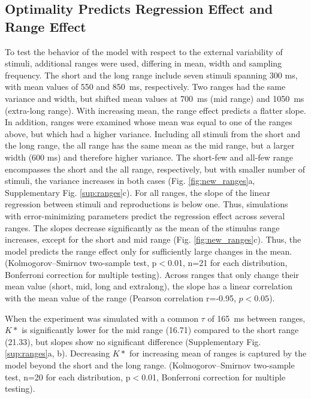 \documentclass[10pt]{article}
\begin{document}
\subsection{Optimality Predicts Regression Effect and Range Effect}
To test the behavior of the model with respect to the external variability of stimuli, additional ranges were used, differing in mean, width and sampling frequency.
The short and the long range include seven stimuli spanning 300 ms, with mean values of 550 and 850~ms, respectively. 
Two ranges had the same variance and width, but shifted mean values at 700~ms (mid range) and 1050~ms (extra-long range). With increasing mean, the range effect predicts a flatter slope. 
In addition, ranges were examined whose mean was equal to one of the ranges above, but which had a higher variance.
Including all stimuli from the short and the long range, the all range has the same mean as the mid range, but a larger width (600 ms) and therefore higher variance.
The short-few and all-few range encompasses the short and the all range, respectively, but with smaller number of stimuli, the variance increases in both cases 
(Fig. \ref{fig:new_ranges}a, Supplementary Fig. \ref{sup:ranges}c).
For all ranges, the slope of the linear regression between stimuli and reproductions is below one. Thus, simulations with error-minimizing parameters predict the regression effect across several ranges. 
The slopes decrease significantly as the mean of the stimulus range increases, except for the short and mid range (Fig. \ref{fig:new_ranges}c).
Thus, the model predicts the range effect only for sufficiently large changes in the mean. 
(Kolmogorov–Smirnov  two-sample test, p$<$0.01, n=21 for each distribution, Bonferroni correction for multiple testing).
Across ranges that only change their mean value (short, mid, long and extralong), the slope has a linear correlation with the mean value of the range (Pearson correlation r=-0.95, $p<0.05$).

When the experiment was simulated with a common $\tau$ of 165~ms between ranges, $K*$ is significantly lower for the mid range (16.71) compared to the short range (21.33), but slopes show no significant difference (Supplementary Fig. \ref{sup:ranges}a, b).
Decreasing $K*$ for increasing mean of ranges is captured by the model beyond the short and the long range.
(Kolmogorov–Smirnov two-sample test, n=20 for each distribution, p$<$0.01, Bonferroni correction for multiple testing).\\
\end{document}
